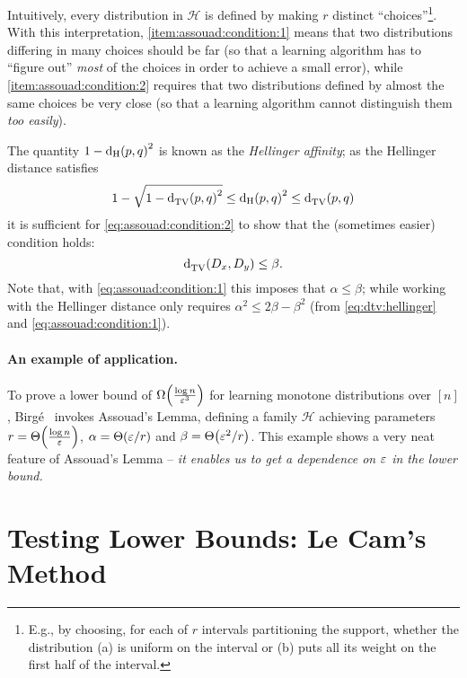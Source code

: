 \documentclass[11pt]{article}
\begin{document}
\begin{remark}
Intuitively, every distribution in $\mathcal{H}$ is defined by making $r$ distinct ``choices''\footnote{E.g., by choosing, for each of $r$ intervals partitioning the support, whether the distribution \textsf{(a)} is uniform on the interval or \textsf{(b)} puts all its weight on the first half of the interval.}. With this interpretation, \autoref{item:assouad:condition:1} means that two distributions differing in many choices should be far (so that a learning algorithm has to ``figure out'' \emph{most} of the choices in order to achieve a small error), while \autoref{item:assouad:condition:2} requires that two distributions defined by almost the same choices be very close (so that a learning algorithm cannot distinguish them \emph{too easily}).
\end{remark}

\begin{remark}
The quantity $1-{\operatorname{d_{\rm{}H}}\!\left({p, q}\right)}^2$ is known as the \emph{Hellinger affinity}; as the Hellinger distance satisfies
\begin{equation}\label{eq:dtv:hellinger}
1 - \sqrt{1-{\operatorname{d}_{\rm TV}^{}\!\left({p, q}\right)}^2} \leq {\operatorname{d_{\rm{}H}}\!\left({p, q}\right)}^2 \leq {\operatorname{d}_{\rm TV}^{}\!\left({p, q}\right)}
\end{equation}
it is sufficient for \eqref{eq:assouad:condition:2} to show that the (sometimes easier) condition holds:
\[
{\operatorname{d}_{\rm TV}^{}\!\left({D_x, D_y}\right)} \leq \beta.
\]
Note that, with \eqref{eq:assouad:condition:1} this imposes that $\alpha \leq \beta$; while working with the Hellinger distance only requires $\alpha^2 \leq 2\beta-\beta^2$ (from \eqref{eq:dtv:hellinger} and \eqref{eq:assouad:condition:1}).
\end{remark}

\paragraph*{An example of application.} To prove a lower bound of $\bigOmega{\frac{\log n}{\eps^3}}$ for learning monotone distributions over $[n]$, Birg\'e~\cite{Birge:87} invokes Assouad's Lemma, defining a family $\mathcal{H}$ achieving parameters $r=\bigTheta{\frac{\log n}{\eps}}$, $\alpha=\bigTheta{\eps/r}$ and $\beta=\bigTheta{\eps^2/r}$. This example shows a very neat feature of Assouad's Lemma -- \emph{it enables us to get a dependence on $\varepsilon$ in the lower bound.}

\section{Testing Lower Bounds: Le Cam's Method}
\end{document}
